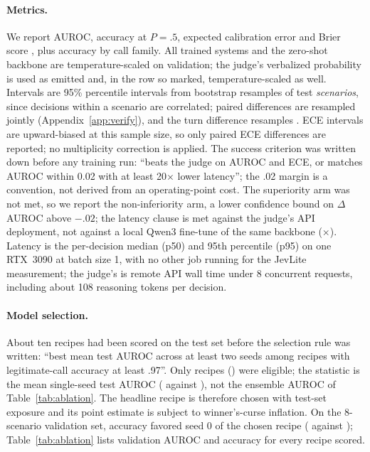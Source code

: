 \documentclass[11pt]{article}
\begin{document}
\paragraph{Metrics.} We report AUROC, accuracy at $P=.5$, expected calibration error \citep[ECE; ten equal-width bins,][]{naeini2015ece} and Brier score \citep{brier1950,gneiting2007proper}, plus accuracy by call family. All trained systems and the zero-shot backbone are temperature-scaled on validation; the judge's verbalized probability is used as emitted and, in the row so marked, temperature-scaled as well. Intervals are 95\% percentile intervals from \nboot{} bootstrap resamples of test \emph{scenarios}, since decisions within a scenario are correlated; paired differences are resampled jointly (Appendix~\ref{app:verify}), and the turn difference resamples \turnDiffCiUnit. ECE intervals are upward-biased at this sample size, so only paired ECE differences are reported; no multiplicity correction is applied. The success criterion was written down before any training run: ``beats the judge on AUROC and ECE, or matches AUROC within 0.02 with at least 20$\times$ lower latency''; the .02 margin is a convention, not derived from an operating-point cost. The superiority arm was not met, so we report the non-inferiority arm, a lower confidence bound on $\Delta$AUROC above $-.02$; the latency clause is met against the judge's API deployment, not against a local Qwen3 fine-tune of the same backbone (\armAlatratio$\times$). Latency is the per-decision median (p50) and 95th percentile (p95) on one RTX~3090 at batch size 1, with no other job running for the JevLite measurement; the judge's is remote API wall time under 8 concurrent requests, including about 108 reasoning tokens per decision.

\paragraph{Model selection.} About ten recipes had been scored on the test set before the selection rule was written: ``best mean test AUROC across at least two seeds among recipes with legitimate-call accuracy at least .97''. Only  recipes () were eligible; the statistic is the mean single-seed test AUROC (\recipeDseedmean{} against \recipeAseedmean), not the ensemble AUROC of Table~\ref{tab:ablation}. The headline recipe is therefore chosen with test-set exposure and its point estimate is subject to winner's-curse inflation. On the 8-scenario validation set, accuracy favored seed 0 of the chosen recipe (\valPickAcc{} against \valPickAltAcc); Table~\ref{tab:ablation} lists validation AUROC and accuracy for every recipe scored.
\end{document}
